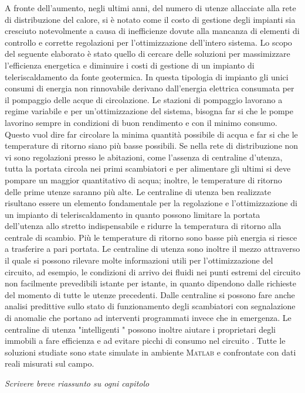\documentclass[laurea,oneside,11pt]{USiena_tesiLM}
\begin{document}
A fronte dell'aumento, negli ultimi anni, del numero di utenze allacciate alla rete di distribuzione del calore, si è notato come il costo di gestione degli impianti sia cresciuto notevolmente a causa di inefficienze dovute alla mancanza di elementi di controllo e corrette regolazioni per l'ottimizzazione dell'intero sistema.
Lo scopo del seguente elaborato è stato quello di cercare delle soluzioni per massimizzare l'efficienza energetica e diminuire i costi di gestione di un impianto di teleriscaldamento da fonte geotermica. In questa tipologia di impianto gli unici consumi di energia non rinnovabile  derivano dall'energia elettrica consumata  per il pompaggio delle acque di circolazione. 
Le stazioni di pompaggio lavorano a regime variabile e per un'ottimizzazione del sistema, bisogna far si che le pompe lavorino sempre in condizioni di buon rendimento e con il minimo consumo. Questo vuol dire far circolare la minima quantità possibile di acqua e far si che le temperature di ritorno siano più basse possibili. Se nella rete di distribuzione non vi sono regolazioni presso le abitazioni, come l'assenza di centraline d'utenza, tutta la portata circola nei primi scambiatori e per alimentare gli ultimi si deve pompare un maggior quantitativo di acqua; inoltre, le temperature di ritorno delle prime utenze saranno più alte. Le centraline di utenza ben realizzate risultano essere un elemento fondamentale per la regolazione e l'ottimizzazione di un impianto di teleriscaldamento in quanto possono  limitare la portata dell'utenza allo stretto indispensabile e ridurre la temperatura di ritorno alla centrale di scambio. Più le temperature di ritorno sono basse più energia si riesce a trasferire a pari portata. Le centraline di utenza sono inoltre il mezzo attraverso il quale si possono rilevare molte informazioni utili per l'ottimizzazione del circuito, ad esempio, le condizioni di arrivo dei fluidi nei punti estremi del circuito non facilmente prevedibili istante per istante, in quanto dipendono dalle richieste del momento di tutte le utenze precedenti.
Dalle centraline si possono fare anche analisi predittive sullo stato di funzionamento degli scambiatori con segnalazione di anomalie che portano ad interventi programmati invece che in emergenza.
Le centraline di utenza "intelligenti " possono inoltre aiutare i proprietari degli immobili a fare efficienza e ad evitare picchi di consumo nel circuito .
Tutte le soluzioni studiate sono state simulate in ambiente \textsc{Matlab} e confrontate con dati reali misurati sul campo.

\textit{Scrivere breve riassunto su ogni capitolo}
\end{document}
